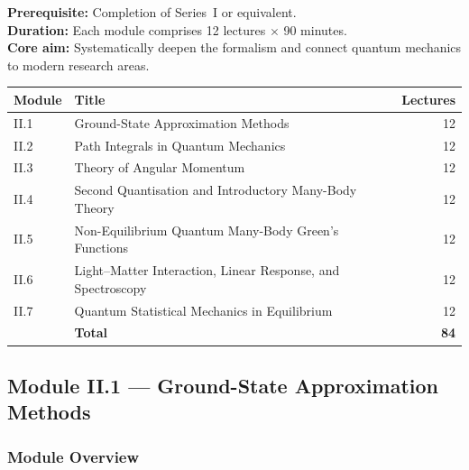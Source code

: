 \documentclass[11pt,a4paper]{article}
\begin{document}
\begin{tcolorbox}[seriesbox, title={Series~II Overview}]
\textbf{Prerequisite:} Completion of Series~I or equivalent.\\
\textbf{Duration:} Each module comprises 12 lectures $\times$ 90 minutes.\\
\textbf{Core aim:} Systematically deepen the formalism and connect quantum
mechanics to modern research areas.\\[4pt]
\begin{tabular}{llr}
\toprule
\textbf{Module} & \textbf{Title} & \textbf{Lectures}\\
\midrule
II.1 & Ground-State Approximation Methods & 12\\
II.2 & Path Integrals in Quantum Mechanics & 12\\
II.3 & Theory of Angular Momentum & 12\\
II.4 & Second Quantisation and Introductory Many-Body Theory & 12\\
II.5 & Non-Equilibrium Quantum Many-Body Green's Functions & 12\\
II.6 & Light--Matter Interaction, Linear Response, and Spectroscopy & 12\\
II.7 & Quantum Statistical Mechanics in Equilibrium & 12\\
\midrule
 & \textbf{Total} & \textbf{84}\\
\bottomrule
\end{tabular}
\end{tcolorbox}

\subsection{Module II.1 --- Ground-State Approximation Methods}
\label{sec:mod-II1}

\subsubsection*{Module Overview}
\end{document}
